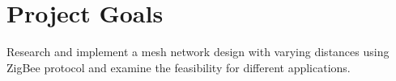 \section{Project Goals}
Research and implement a mesh network design with varying distances using ZigBee protocol and examine the feasibility for different applications.


%
%
%
%
%
%
%
%

